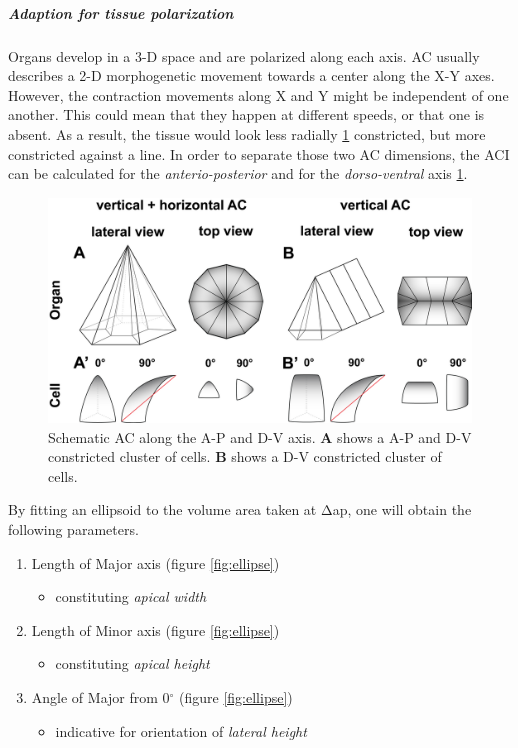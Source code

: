 \documentclass[11pt,singlespacinge,twoside]{reedthesis} %
\providecommand{\tightlist}{%
  \setlength{\itemsep}{0pt}\setlength{\parskip}{0pt}}
\def\labelenumi{\arabic{enumi}.}
\begin{document}
\hypertarget{ACI-pol}{%
\subparagraph{Adaption for tissue polarization}\label{ACI-pol}}

Organs develop in a 3-D space and are polarized along each axis. AC usually describes a 2-D morphogenetic movement towards a center along the X-Y axes. However, the contraction movements along X and Y might be independent of one another. This could mean that they happen at different speeds, or that one is absent. As a result, the tissue would look less radially \ref{fig:cellpol} constricted, but more constricted against a line. In order to separate those two AC dimensions, the ACI can be calculated for the \emph{anterio-posterior} and for the \emph{dorso-ventral} axis \ref{fig:cellpol}.


\begin{figure}

{\centering \includegraphics[width=0.75\linewidth]{figure/02-MaMo/ACI/ACI_Cells_pol} 

}

\caption[Schematic anisotropic AC]{Schematic AC along the A-P and D-V axis. \textbf{A} shows a A-P and D-V constricted cluster of cells. \textbf{B} shows a D-V constricted cluster of cells.}\label{fig:cellpol}
\end{figure}
\noindent By fitting an ellipsoid to the volume area taken at \(\mathrm{\Delta}\)ap, one will obtain the following parameters.
\begin{enumerate}
\def\labelenumi{\arabic{enumi}.}
\tightlist
\item
  Length of Major axis (figure \ref{fig:ellipse})
  \begin{itemize}
  \tightlist
  \item
    constituting \emph{apical width}
  \end{itemize}
\item
  Length of Minor axis (figure \ref{fig:ellipse})
  \begin{itemize}
  \tightlist
  \item
    constituting \emph{apical height}
  \end{itemize}
\item
  Angle of Major from 0\(^\circ\) (figure \ref{fig:ellipse})
  \begin{itemize}
  \tightlist
  \item
    indicative for orientation of \emph{lateral height}
  \end{itemize}
\end{enumerate}
\end{document}
